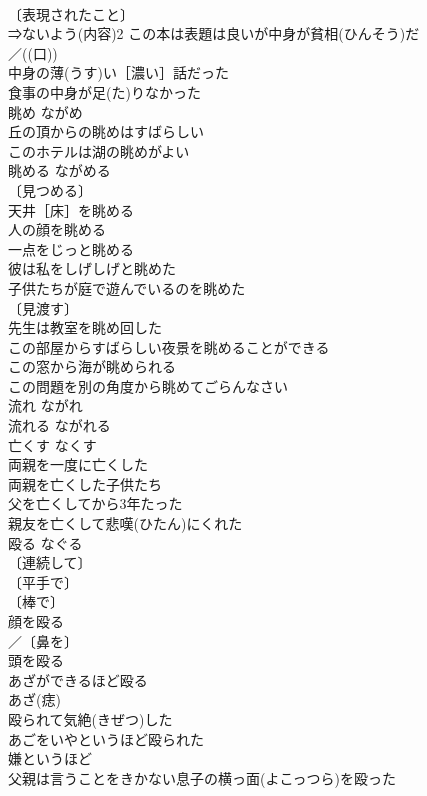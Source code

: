 \documentclass[8pt]{extreport}
\begin{document}
\begin{CJK}{UTF8}{min}
\\	〔表現されたこと〕
\\	⇒ないよう(内容)2 この本は表題は良いが中身が貧相(ひんそう)だ 
\\	／((口)) 
\\	中身の薄(うす)い［濃い］話だった 
\\	食事の中身が足(た)りなかった 
\\	眺め	ながめ	
\\	丘の頂からの眺めはすばらしい 
\\	このホテルは湖の眺めがよい 
\\	眺める	ながめる	
\\	〔見つめる〕
\\	天井［床］を眺める 
\\	人の顔を眺める 
\\	一点をじっと眺める 
\\	彼は私をしげしげと眺めた 
\\	子供たちが庭で遊んでいるのを眺めた 
\\	〔見渡す〕
\\	先生は教室を眺め回した 
\\	この部屋からすばらしい夜景を眺めることができる 
\\	この窓から海が眺められる 
\\	この問題を別の角度から眺めてごらんなさい 
\\	流れ	ながれ	
\\	流れる	ながれる	
\\	亡くす	なくす	
\\	両親を一度に亡くした 
\\	両親を亡くした子供たち 
\\	父を亡くしてから3年たった 
\\	親友を亡くして悲嘆(ひたん)にくれた 
\\	殴る	なぐる	
\\	〔連続して〕
\\	〔平手で〕
\\	〔棒で〕
\\	顔を殴る 
\\	／〔鼻を〕
\\	頭を殴る 
\\	あざができるほど殴る 
\\	あざ(痣)　
\\	殴られて気絶(きぜつ)した 
\\	あごをいやというほど殴られた 
\\	嫌というほど　
\\	父親は言うことをきかない息子の横っ面(よこっつら)を殴った 

\end{CJK}
\end{document}
